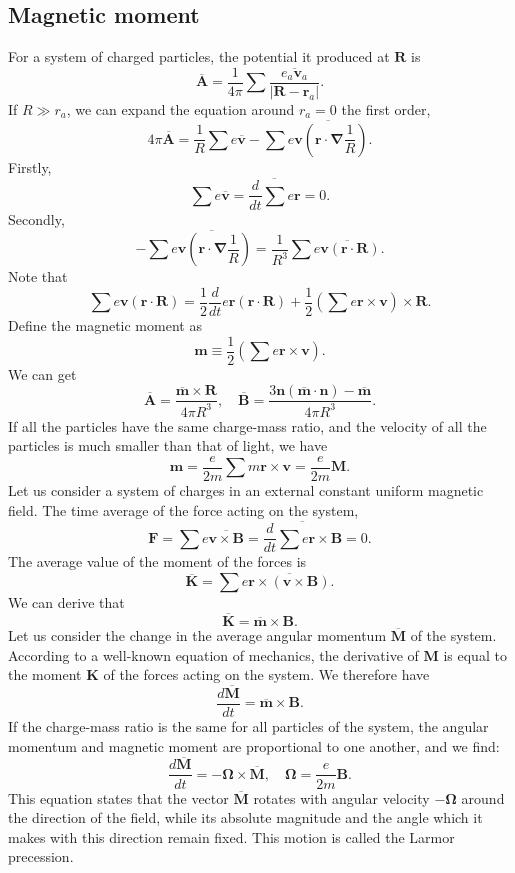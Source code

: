 \subsection{Magnetic moment}
For a system of charged particles, the potential it produced at $\bm{R}$ is
\[\overline{\bm{A}} = \frac{1}{4\pi} \sum \overline{\frac{e_a \bm{v}_a}{|\bm{R}-\bm{r}_a|}}.\]
If $R \gg r_a$, we can expand the equation around $r_a=0$ the first order,
\[4\pi \overline{\bm{A}} = \frac{1}{R} \sum e \overline{\bm{v}} - \sum \overline{e \bm{v} \left( \bm{r} \cdot \bm{\nabla} \frac{1}{R}\right)}.\]
Firstly,
\[\sum e \overline{\bm{v}} = \overline{\frac{d}{dt} \sum e \bm{r}} = 0.\]
Secondly,
\[-\sum \overline{e \bm{v} \left( \bm{r} \cdot \bm{\nabla} \frac{1}{R}\right)} = \frac{1}{R^3} \sum \overline{e\bm{v} (\bm{r} \cdot \bm{R})}.\]
Note that
\[\sum e\bm{v} (\bm{r} \cdot \bm{R}) = \frac{1}{2} \frac{d}{dt} e\bm{r}(\bm{r}\cdot\bm{R}) + \frac{1}{2} \left(\sum e \bm{r} \times \bm{v}\right) \times \bm{R}.\]
Define the magnetic moment as
\[\bm{m} \equiv \frac{1}{2} \left(\sum e \bm{r} \times \bm{v}\right).\]
We can get
\[\overline{\bm{A}} = \frac{\overline{\bm{m}} \times \bm{R}}{4\pi R^3} , \quad \overline{\bm{B}} = \frac{3\bm{n}(\overline{\bm{m}} \cdot \bm{n})-\overline{\bm{m}}}{4\pi R^3}.\]
If all the particles have the same charge-mass ratio, and the velocity of all the particles is much smaller than that of light, we have
\[\bm{m} = \frac{e}{2m} \sum m \bm{r} \times \bm{v} = \frac{e}{2m} \bm{M}.\]
Let us consider a system of charges in an external constant uniform magnetic field. The time average of the force acting on the system, 
\[\bm{F} = \sum e \overline{\bm{v} \times \bm{B}} = \overline{\frac{d}{dt} \sum e \bm{r} \times \bm{B}} = 0.\]
The average value of the moment of the forces is 
\[\overline{\bm{K}} = \sum e \overline{\bm{r} \times (\bm{v} \times \bm{B})}.\]
We can derive that
\[\overline{\bm{K}} = \overline{\bm{m}} \times \bm{B}.\]
Let us consider the change in the average angular momentum $\overline{\bm{M}}$ of the system. According to a well-known equation of mechanics, the derivative of $\bm{M}$ is equal to the moment $\bm{K}$ of the forces acting on the system. We therefore have
\[\frac{d \overline{\bm{M}}}{dt} = \overline{\bm{m}} \times \bm{B}.\]
If the charge-mass ratio is the same for all particles of the system, the angular momentum and magnetic moment are proportional to one another, and we find:
\[\frac{d \overline{\bm{M}}}{dt} = - \bm{\Omega} \times \overline{\bm{M}} , \quad \bm{\Omega} = \frac{e}{2m} \bm{B}.\]
This equation states that the vector $\overline{\bm{M}}$ rotates with angular velocity $-\bm{\Omega}$ around the direction of the field, while its absolute magnitude and the angle which it makes with this direction remain fixed. This motion is called the Larmor precession.

